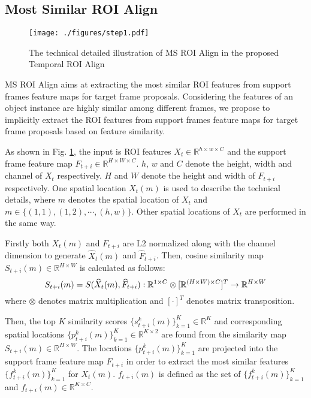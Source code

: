 \documentclass[letterpaper]{article} \usepackage{aaai21}  \usepackage{times}  \usepackage{helvet} \usepackage{courier}  \usepackage[hyphens]{url}  \usepackage{graphicx} \usepackage{hyperref}
\begin{document}
\subsection{Most Similar ROI Align}
\begin{figure}[t]
\centering
\texttt{[image: ./figures/step1.pdf]}
\caption{The technical detailed illustration of MS ROI Align in the proposed Temporal ROI Align}
\label{fig:step1}
\vspace{-0.4cm}
\end{figure}
MS ROI Align aims at extracting the most similar ROI features from support frames feature maps for target frame proposals. Considering the features of an object instance are highly similar among different frames, we propose to implicitly extract the ROI features from support frames feature maps for target frame proposals based on feature similarity.

As shown in Fig. \ref{fig:step1}, the input is ROI features $X_t\in\mathbb{R}^{h\times w\times C}$ and the support frame feature map $F_{t+i}\in\mathbb{R}^{H\times W\times C}$. $h$, $w$ and $C$ denote the height, width and channel of $X_t$ respectively. $H$ and $W$ denote the height and width of $F_{t+i}$ respectively. One spatial location $X_t(m)$ is used to describe the technical details, where $m$ denotes the spatial location of $X_t$ and $m\in\{(1,1),(1,2), \cdots, (h,w)\}$. Other spatial locations of $X_t$ are performed in the same way.



Firstly both $X_t(m)$ and $F_{t+i}$ are L2 normalized along with the channel dimension to generate $\widehat{X}_t(m)$ and $\widehat{F}_{t+i}$.
Then, cosine similarity map $S_{t+i}(m)\in\mathbb{R}^{H\times W}$ is calculated as follows:
\begin{equation}
\small
S_{t+i}(m) = S(\widehat{X}_t(m), \widehat{F}_{t+i}):\mathbb{R}^{1\times C} \otimes [\mathbb{R}^{(H\times W)\times C}]^T \rightarrow \mathbb{R}^{ H\times W}
\end{equation}
where $\otimes$ denotes matrix multiplication and $[\cdot]^T$ denotes matrix transposition.

Then, the top $K$ similarity scores $\{s_{t+i}^k(m)\}_{k=1}^{K}\in\mathbb{R}^{K}$ and corresponding spatial locations $\{p_{t+i}^k(m)\}_{k=1}^{K}\in\mathbb{R}^{K\times 2}$ are found from the similarity map $S_{t+i}(m)\in\mathbb{R}^{H\times W}$.
The locations  $\{p_{t+i}^k(m)\}_{k=1}^{K}$ are projected into the support frame feature map $F_{t+i}$ in order to extract the most similar features  $\{f_{t+i}^k(m)\}_{k=1}^{K}$ for $X_t(m)$. $f_{t+i}(m)$ is defined as the set of $\{f_{t+i}^k(m)\}_{k=1}^{K}$ and $f_{t+i}(m)\in\mathbb{R}^{K\times C}$.
\end{document}
